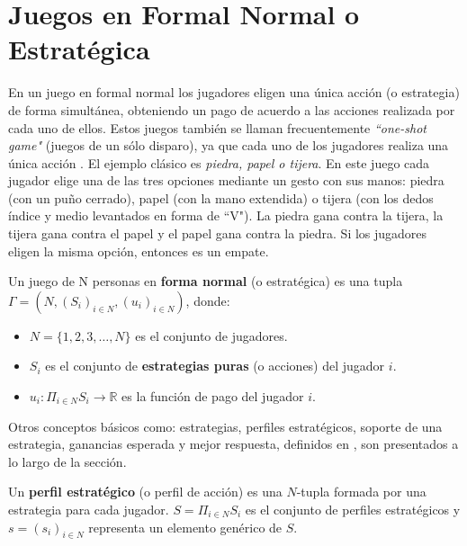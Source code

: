 \section{Juegos en Formal Normal o Estratégica}
\label{section:forma-normal}

En un juego en formal normal los jugadores eligen una única acción (o estrategia) de forma simultánea, obteniendo un pago de acuerdo a las acciones realizada por cada uno de ellos. Estos juegos también se llaman frecuentemente \textit{``one-shot game"}   (juegos de un sólo disparo), ya que cada uno de los jugadores realiza una única acción \cite{bib:introductionCFR}. El ejemplo clásico es \textit{piedra, papel o tijera}. En este juego cada jugador elige una de las tres opciones mediante un gesto con sus manos: piedra (con un puño cerrado), papel (con la mano extendida) o tijera (con los dedos índice y medio levantados en forma de ``V"). La piedra gana contra la tijera, la tijera gana contra el papel y el papel gana contra la piedra. Si los jugadores eligen la misma opción, entonces es un empate.

\begin{definition}
\label{def:forma-normal}
Un juego de N personas en \textbf{forma normal} (o estratégica) es una tupla $\Gamma = (N, (S_i)_{i \in N}, (u_i)_{i \in N})$, donde:
	\begin{itemize}[noitemsep]
		\item $N = \{1, 2, 3, \dots, N\}$ es el conjunto de jugadores.
		\item  $S_i$ es el conjunto de \textbf{estrategias puras} (o acciones) del jugador $i$.
		\item $u_i : \Pi _{i \in N} S_i \rightarrow \mathbb{R}$ es la función de pago del jugador $i$.
	\end{itemize}
\end{definition}

Otros conceptos básicos como: estrategias, perfiles estratégicos, soporte de una estrategia, ganancias esperada y mejor respuesta, definidos en \cite{bib:tutorial-existence-nash}, son presentados a lo largo de la sección.

\begin{definition} Un \textbf{perfil estratégico} (o perfil de acción) es una $N$-tupla formada por una estrategia para cada jugador. $S = \Pi_{i \in N}S_i$ es el conjunto de perfiles estratégicos y $s = (s_i)_{i \in N}$ representa un elemento genérico de $S$.  
\end{definition}

